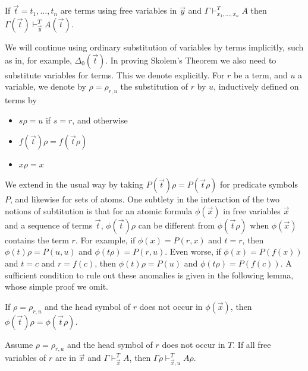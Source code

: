 \documentclass[10pt,a4paper]{article}
\begin{document}
\begin{lemma}\label{subst1}
If $\vec{t} = t_1,\dots,t_n$ are terms using free variables in $\vec{y}$ and
$\Gamma\vdash_{x_1,\dots,x_n}^T A$ then $\Gamma(\vec{t})\vdash_{\vec{y}}^T A(\vec{t})$.
\end{lemma}

We will continue using ordinary substitution of variables by terms implicitly, such as in,
for example, $\Delta_0(\vec{t})$. In proving Skolem's Theorem we also need to
substitute variables for terms. This we denote explicitly.
For $r$ be a term, and $u$ a variable, we denote by $\rho = \rho_{r,u}$ the 
substitution of $r$ by $u$, inductively defined on terms by
\begin{itemize}
\item $s\rho = u$ if $s = r$, and otherwise
\item $f(\vec{t})\rho = f(\vec{t}\rho)$
\item $x\rho = x$
\end{itemize}
We extend in the usual way by taking $P(\vec{t})\rho = P(\vec{t}\rho)$ for
predicate symbols  $P$, and likewise for sets of atoms. 
One subtlety in the interaction of the two notions of subtitution is that for an
atomic formula $\phi(\vec{x})$ in free variables $\vec{x}$ and
a sequence of terms $\vec{t}$, $\phi(\vec{t})\rho$
can be different from $\phi(\vec{t}\rho)$ when $\phi(\vec{x})$
contains the term $r$. For example, if  $\phi(x) = P(r,x)$
and $t=r$, then $\phi(t)\rho = P(u,u)$ and $\phi(t\rho) = P(r,u)$.
Even worse, if $\phi(x) = P(f(x))$ and $t=c$ and $r=f(c)$,
then $\phi(t)\rho = P(u)$ and $\phi(t\rho) = P(f(c))$.
A sufficient condition to rule out these anomalies is given in
the following lemma, whose simple proof we omit.

\begin{lemma}\label{subst0}
If $\rho = \rho_{r,u}$ and the head symbol of $r$ does not occur in 
$\phi(\vec{x})$, then $\phi(\vec{t})\rho =\phi(\vec{t}\rho)$.
\end{lemma}

\begin{lemma}\label{subst2}
Assume $\rho = \rho_{r,u}$ and the head symbol of $r$ does not occur in $T$.
If all free variables of $r$ are in $\vec{x}$ and
$\Gamma\vdash_{\vec{x}}^T A$, then $\Gamma\rho\vdash_{\vec{x},u}^T A\rho$.
\end{lemma}
\end{document}
